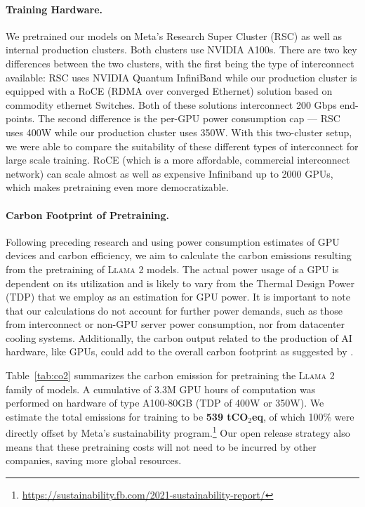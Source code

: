 \documentclass{article}
\newcommand{\cinnamon}{\textsc{Llama 2}\xspace}
\begin{document}
\paragraph{Training Hardware.} 
We pretrained our models on Meta's Research Super Cluster (RSC) \citep{lee2022rsc} as well as internal production clusters. Both clusters use NVIDIA A100s.  There are two key differences between the two clusters, with the first being the type of interconnect available: RSC uses NVIDIA Quantum InfiniBand while our production cluster is equipped with a RoCE (RDMA over converged Ethernet) solution based on commodity ethernet Switches. Both of these solutions interconnect 200 Gbps end-points. The second difference is the per-GPU power consumption cap --- RSC uses 400W while our production cluster uses 350W.  With this two-cluster setup, we were able to compare the suitability of these different types of interconnect for large scale training.  RoCE (which is a more affordable, commercial interconnect network) can scale almost as well as expensive Infiniband up to 2000 GPUs, which makes pretraining even more democratizable. 

\paragraph{Carbon Footprint of Pretraining.} 
\label{sec:carbon}
Following preceding research \citep{bender-et-al-2021,patterson2021carbon,wu2022sustainable,dodge2022measuring} and using power consumption estimates of GPU devices and carbon efficiency, we aim to calculate the carbon emissions resulting from the pretraining of \cinnamon models. The actual power usage of a GPU is dependent on its utilization and is likely to vary from the Thermal Design Power (TDP) that we employ as an estimation for GPU power. It is important to note that our calculations do not account for further power demands, such as those from interconnect or non-GPU server power consumption, nor from datacenter cooling systems. Additionally, the carbon output related to the production of AI hardware, like GPUs, could add to the overall carbon footprint as suggested by \cite{gupta2022chasing,gupta2022act}.

Table~\ref{tab:co2} summarizes the carbon emission for pretraining the \cinnamon family of models. A cumulative of 3.3M GPU hours of computation was performed on hardware of type A100-80GB (TDP of 400W or 350W). We estimate the total emissions for training to be \textbf{539 tCO$_2$eq}, of which 100\% were directly offset by Meta's sustainability program.\footnote{\url{https://sustainability.fb.com/2021-sustainability-report/}} Our open release strategy also means that these pretraining
costs will not need to be incurred by other companies, saving more global resources.
\end{document}
